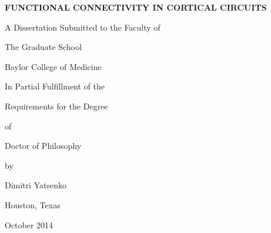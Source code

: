\documentclass[12pt,letterpaper,titlepage,twoside,openright]{report}
\begin{document}
\begin{titlepage}
\begin{center}

\vspace*{2cm}
\textbf{\uppercase{\large Functional connectivity in cortical circuits}}

\vspace{1.5cm}
A Dissertation Submitted to the Faculty of

\medskip
The Graduate School 

Baylor College of Medicine

\vspace{1.5cm}
In Partial Fulfillment of the 

Requirements for the Degree

of 

Doctor of Philosophy

by 

\bigskip
{\large Dimitri Yatsenko}

\vfill
Houston, Texas

October 2014

\end{center}
\end{titlepage}


\end{document}
